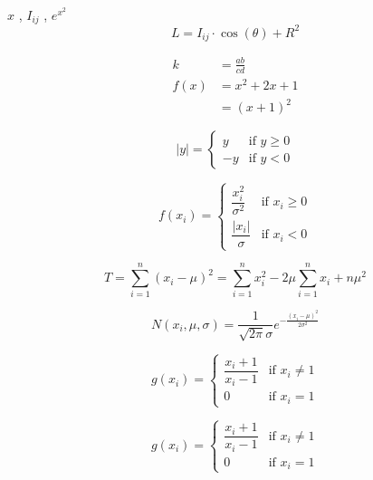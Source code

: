 \documentclass{article}
\begin{document}



$x$ , $I_{ij}$ , $e^{x^2}$
\begin{equation}
    L=I_{ij}\cdot\cos(\theta) +R^2
    \label{eq:lighting}
\end{equation}


\begin{align}
    k &=\frac{ab}{cd}\\
    f(x) &=x^2+2x+1 \nonumber \\
        &= (x+1)^2
\end{align}

\[
  |y| =
  \begin{cases}
    y & \text{if } y \geq 0 \\ %
    -y & \text{if } y < 0
  \end{cases}
\] 

\[
  f(x_i) =
  \begin{cases}
    \dfrac{x_i^2}{\sigma^2} & \text{if } x_i \geq 0 \\[1mm] %
    \dfrac{|x_i|}{\sigma} & \text{if } x_i < 0
  \end{cases}
\]


\begin{equation}
  T = \sum_{i=1}^{n} (x_i - \mu)^2
    = \sum_{i=1}^{n} x_i^2 - 2\mu \sum_{i=1}^{n} x_i + n\mu^2
  \label{eq:variance}
\end{equation}


\[
  N(x_i, \mu, \sigma) = \frac{1}{\sqrt{2\pi}\sigma}
    e^{-\frac{(x_i-\mu)^2}{2\sigma^2}}
\]

\[
g(x_i)= \begin{cases}
    \dfrac{x_i+1}{x_i-1} &\text{if } x_i \neq 1 \\
     0 &\text{if } x_i = 1
\end{cases}
\]


\begin{equation}
  g(x_i)= \begin{cases}
    \dfrac{x_i+1}{x_i-1} &\text{if } x_i \neq 1 \\
     0 &\text{if } x_i =1
\end{cases}
\end{equation}

\end{document}
